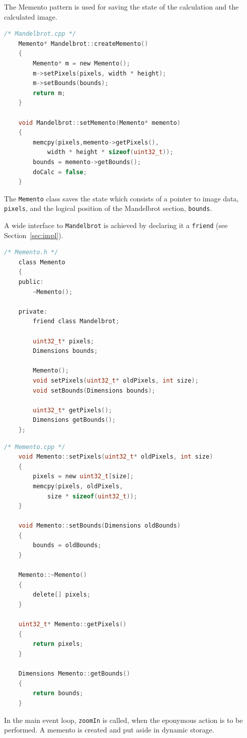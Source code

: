 \documentclass[11pt, a4paper, twoside]{article}
\begin{document}
	The Memento pattern is used for saving the state of the calculation and the calculated image.
	
	\begin{lstlisting}[language=c]
	/* Mandelbrot.cpp */
	Memento* Mandelbrot::createMemento()
	{
		Memento* m = new Memento();
		m->setPixels(pixels, width * height);
		m->setBounds(bounds);
		return m;
	}
	
	void Mandelbrot::setMemento(Memento* memento)
	{
		memcpy(pixels,memento->getPixels(),
			width * height * sizeof(uint32_t));
		bounds = memento->getBounds();
		doCalc = false;
	}
	\end{lstlisting}
	
	The \verb|Memento| class saves the state which consists of a pointer to image data, \verb|pixels|, and the logical position of the Mandelbrot section, \verb|bounds|.
	
	A wide interface to \verb|Mandelbrot| is achieved by declaring it a \verb|friend| (see Section~\ref{sec:impl}).
	
	\begin{lstlisting}[language=c]
	/* Memento.h */
	class Memento
	{
	public:
		~Memento();
		
	private:
		friend class Mandelbrot;
		
		uint32_t* pixels;
		Dimensions bounds;
		
		Memento();
		void setPixels(uint32_t* oldPixels, int size);
		void setBounds(Dimensions bounds);
		
		uint32_t* getPixels();
		Dimensions getBounds();
	};
	\end{lstlisting}
	
	\begin{lstlisting}[language=c]
	/* Memento.cpp */
	void Memento::setPixels(uint32_t* oldPixels, int size)
	{
		pixels = new uint32_t[size];
		memcpy(pixels, oldPixels,
			size * sizeof(uint32_t));
	}
	
	void Memento::setBounds(Dimensions oldBounds)
	{
		bounds = oldBounds;
	}
	
	Memento::~Memento()
	{
		delete[] pixels;
	}
	
	uint32_t* Memento::getPixels()
	{
		return pixels;
	}
	
	Dimensions Memento::getBounds()
	{
		return bounds;
	}
	\end{lstlisting}
	
	In the main event loop, \verb|zoomIn| is called, when the eponymous action is to be performed. A memento is created and put aside in dynamic storage.
	
\end{document}
